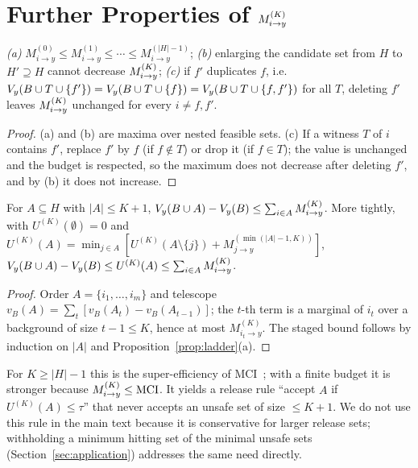 \section{Further Properties of $M^{(K)}_{i \to y}$}\label{app:proofs}

\begin{proposition}\label{prop:ladder}
\emph{(a)} $M^{(0)}_{i\to y}\le M^{(1)}_{i\to y}\le\cdots\le M^{(|H|-1)}_{i\to y}$;
\emph{(b)} enlarging the candidate set from $H$ to $H'\supseteq H$ cannot decrease $M^{(K)}_{i \to y}$;
\emph{(c)} if $f'$ duplicates $f$, i.e.\ $V_{y}(B\cup T\cup\{f'\})=V_{y}(B\cup T\cup\{f\})=V_{y}(B\cup T\cup\{f,f'\})$
for all $T$, deleting $f'$ leaves $M^{(K)}_{i \to y}$ unchanged for every $i\ne f,f'$.
\end{proposition}
\begin{proof}
(a) and (b) are maxima over nested feasible sets. (c) If a witness $T$ of $i$ contains $f'$,
replace $f'$ by $f$ (if $f\notin T$) or drop it (if $f\in T$); the value is unchanged and the budget
is respected, so the maximum does not decrease after deleting $f'$, and by (b) it does not increase.
\end{proof}

\begin{theorem}\label{thm:super}
For $A\subseteq H$ with $|A|\le K+1$, $V_{y}(B\cup A)-V_{y}(B)\le\sum_{i\in A}M^{(K)}_{i \to y}$. More tightly, with
$U^{(K)}(\emptyset)=0$ and $U^{(K)}(A)=\min_{j\in A}[U^{(K)}(A\setminus\{j\})+M^{(\min(|A|-1,K))}_{j\to y}]$,
$V_{y}(B\cup A)-V_{y}(B)\le U^{(K)}(A)\le\sum_{i\in A}M^{(K)}_{i \to y}$.
\end{theorem}
\begin{proof}
Order $A=\{i_1,\dots,i_m\}$ and telescope $v_B(A)=\sum_t[v_B(A_t)-v_B(A_{t-1})]$; the $t$-th term is a
marginal of $i_t$ over a background of size $t-1\le K$, hence at most $M^{(K)}_{i_t\to y}$. The staged
bound follows by induction on $|A|$ and Proposition~\ref{prop:ladder}(a).
\end{proof}
For $K\ge|H|-1$ this is the super-efficiency of MCI~\cite{catav2021mci}; with a finite budget it is
stronger because $M^{(K)}_{i \to y}\le\mathrm{MCI}$. It yields a release rule ``accept $A$ if $U^{(K)}(A)\le\tau$''
that never accepts an unsafe set of size $\le K+1$. We do not use this rule in the main text because
it is conservative for larger release sets; withholding a minimum hitting set of the minimal unsafe sets
(Section~\ref{sec:application}) addresses the same need directly.

